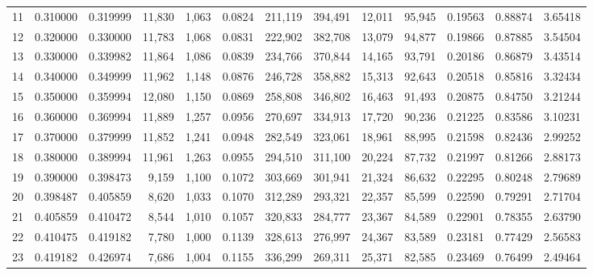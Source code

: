 \begin{tabular}{rrrrrrrrrrrrr}
11 &  0.310000 &  0.319999 &  11,830 &  1,063 &                                     0.0824 &  211,119 &  394,491 &   12,011 &   95,945 &  0.19563 &  0.88874 &  3.65418 \\
12 &  0.320000 &  0.330000 &  11,783 &  1,068 &                                     0.0831 &  222,902 &  382,708 &   13,079 &   94,877 &  0.19866 &  0.87885 &  3.54504 \\
13 &  0.330000 &  0.339982 &  11,864 &  1,086 &                                     0.0839 &  234,766 &  370,844 &   14,165 &   93,791 &  0.20186 &  0.86879 &  3.43514 \\
14 &  0.340000 &  0.349999 &  11,962 &  1,148 &                                     0.0876 &  246,728 &  358,882 &   15,313 &   92,643 &  0.20518 &  0.85816 &  3.32434 \\
15 &  0.350000 &  0.359994 &  12,080 &  1,150 &                                     0.0869 &  258,808 &  346,802 &   16,463 &   91,493 &  0.20875 &  0.84750 &  3.21244 \\
16 &  0.360000 &  0.369994 &  11,889 &  1,257 &                                     0.0956 &  270,697 &  334,913 &   17,720 &   90,236 &  0.21225 &  0.83586 &  3.10231 \\
17 &  0.370000 &  0.379999 &  11,852 &  1,241 &                                     0.0948 &  282,549 &  323,061 &   18,961 &   88,995 &  0.21598 &  0.82436 &  2.99252 \\
18 &  0.380000 &  0.389994 &  11,961 &  1,263 &                                     0.0955 &  294,510 &  311,100 &   20,224 &   87,732 &  0.21997 &  0.81266 &  2.88173 \\
19 &  0.390000 &  0.398473 &   9,159 &  1,100 &                                     0.1072 &  303,669 &  301,941 &   21,324 &   86,632 &  0.22295 &  0.80248 &  2.79689 \\
20 &  0.398487 &  0.405859 &   8,620 &  1,033 &                                     0.1070 &  312,289 &  293,321 &   22,357 &   85,599 &  0.22590 &  0.79291 &  2.71704 \\
21 &  0.405859 &  0.410472 &   8,544 &  1,010 &                                     0.1057 &  320,833 &  284,777 &   23,367 &   84,589 &  0.22901 &  0.78355 &  2.63790 \\
22 &  0.410475 &  0.419182 &   7,780 &  1,000 &                                     0.1139 &  328,613 &  276,997 &   24,367 &   83,589 &  0.23181 &  0.77429 &  2.56583 \\
23 &  0.419182 &  0.426974 &   7,686 &  1,004 &                                     0.1155 &  336,299 &  269,311 &   25,371 &   82,585 &  0.23469 &  0.76499 &  2.49464 \\

\end{tabular}
